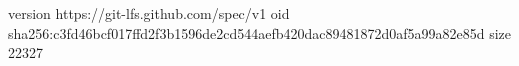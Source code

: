 version https://git-lfs.github.com/spec/v1
oid sha256:c3fd46bcf017ffd2f3b1596de2cd544aefb420dac89481872d0af5a99a82e85d
size 22327
